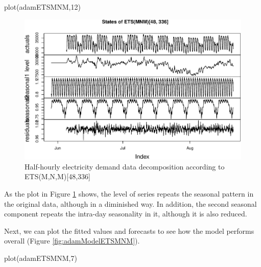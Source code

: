 \documentclass[
]{book}
\newenvironment{Shaded}{\begin{snugshade}}{\end{snugshade}}
\newcommand{\DecValTok}[1]{\textcolor[rgb]{0.00,0.00,0.81}{#1}}
\newcommand{\FunctionTok}[1]{\textcolor[rgb]{0.00,0.00,0.00}{#1}}
\newcommand{\NormalTok}[1]{#1}
\theoremstyle{definition}
\theoremstyle{definition}
\theoremstyle{definition}
\theoremstyle{definition}
\theoremstyle{remark}
\begin{document}
\begin{Shaded}
\begin{Highlighting}[]
\FunctionTok{plot}\NormalTok{(adamETSMNM,}\DecValTok{12}\NormalTok{)}
\end{Highlighting}
\end{Shaded}

\begin{figure}
\centering
\includegraphics{Svetunkov--2022----ADAM_files/figure-latex/adamModelETSMNM12-1.pdf}
\caption{\label{fig:adamModelETSMNM12}Half-hourly electricity demand data decomposition according to ETS(M,N,M){[}48,336{]}}
\end{figure}

As the plot in Figure \ref{fig:adamModelETSMNM12} shows, the level of series repeats the seasonal pattern in the original data, although in a diminished way. In addition, the second seasonal component repeats the intra-day seasonality in it, although it is also reduced.

Next, we can plot the fitted values and forecasts to see how the model performs overall (Figure \ref{fig:adamModelETSMNM}).

\begin{Shaded}
\begin{Highlighting}[]
\FunctionTok{plot}\NormalTok{(adamETSMNM,}\DecValTok{7}\NormalTok{)}
\end{Highlighting}
\end{Shaded}
\end{document}
